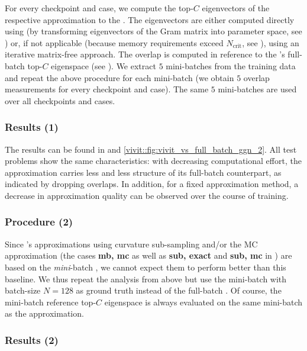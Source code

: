For every checkpoint and case, we compute the top-$C$ eigenvectors of the
respective approximation to the \ggn{}. The eigenvectors are either computed
directly using \vivit (by transforming eigenvectors of the Gram matrix into
parameter space, see ) or, if not
applicable (because memory requirements exceed $N_\text{crit}$, see
), using an iterative matrix-free approach. The overlap
is computed in reference to the \ggn{}'s full-batch top-$C$ eigenspace (see
). We extract $5$ mini-batches from the training data
and repeat the above procedure for each mini-batch (\ie we obtain $5$ overlap
measurements for every checkpoint and case). The same $5$ mini-batches are used
over all checkpoints and cases.

\subsubsection{Results (1)}

The results can be found in
 and \ref{vivit::fig:vivit_vs_full_batch_ggn_2}.
All test problems show the same characteristics: with decreasing computational
effort, the approximation carries less and less structure of its full-batch
counterpart, as indicated by dropping overlaps. In addition, for a fixed
approximation method, a decrease in approximation quality can be observed over
the course of training.



%
\subsubsection{Procedure (2)}
Since \vivit{}'s \ggn approximations using curvature sub-sampling and/or the MC
approximation (the cases \textbf{mb, mc} as well as \textbf{sub, exact} and
\textbf{sub, mc} in ) are based on the
\textit{mini}-batch \ggn{}, we cannot expect them to perform better than this
baseline. We thus repeat the analysis from above but use the mini-batch \ggn
with batch-size $N=128$ as ground truth instead of the full-batch \ggn. Of
course, the mini-batch reference top-$C$ eigenspace is always evaluated on the
same mini-batch as the approximation.

\subsubsection{Results (2)}


